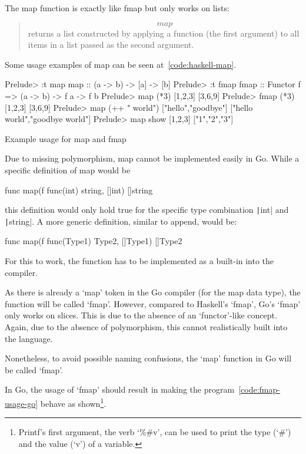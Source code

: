 The map function is exactly like fmap but only works on lists:

\begin{quote}
    \[map\] returns a list constructed by applying a function (the first argument) to all
    items in a list passed as the second argument\autocite{haskell-map}.
\end{quote}

Some usage examples of map can be seen at~\ref{code:haskell-map}.

\begin{listing}
    \begin{haskellcode}
Prelude> :t map
map :: (a -> b) -> [a] -> [b]
Prelude> :t fmap
fmap :: Functor f => (a -> b) -> f a -> f b
Prelude> map (*3) [1,2,3]
[3,6,9]
Prelude> fmap (*3) [1,2,3]
[3,6,9]
Prelude> map (++ " world") ["hello","goodbye"]
["hello world","goodbye world"]
Prelude> map show [1,2,3]
["1","2","3"]
    \end{haskellcode}
    \caption{Example usage for map and fmap}\label{code:haskell-map}
\end{listing}
Due to missing polymorphism, map cannot be implemented easily in Go. While
a specific definition of map would be
\begin{gocode}
func map(f func(int) string, []int) []string
\end{gocode}
this definition would only hold true for the specific type combination \texttt|int|
and \texttt|string|. A more generic definition, similar to append,
would be:
\begin{gocode}
func map(f func(Type1) Type2, []Type1) []Type2
\end{gocode}
For this to work, the function has to be implemented as a built-in into the compiler.

As there is already a `map' token in the Go compiler (for the map data type),
the function will be called `fmap'. However, compared to Haskell's `fmap',
Go's `fmap' only works on slices. This is due
to the absence of an `functor'-like concept. Again, due to the absence of polymorphism,
this cannot realistically built into the language.

Nonetheless, to avoid possible naming confusions, the `map' function in Go will
be called `fmap'.

In Go, the usage of `fmap' should result in making the program~\ref{code:fmap-usage-go}
behave as shown\footnote{Printf's first argument, the
verb `\%\#v', can be used to print the type (`\#') and the value (`v') of a
variable\autocite{fmt-godoc}.}.

